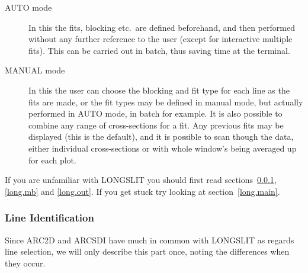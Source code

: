 \begin{description}

\item[AUTO mode] In this the fits, blocking etc.\ are defined
beforehand, and then performed without any further reference to the
user (except for interactive multiple fits).
This can be carried out in batch, thus saving time at the terminal.

\item[MANUAL mode] In this the user can choose the blocking and fit
type for each line as the fits are made, or the fit types may be
defined in manual mode, but actually performed in AUTO mode, in batch
for example.
It is also possible to combine any range of cross-sections for a fit.
Any previous fits may be displayed (this is the default), and it is
possible to scan though the data, either individual cross-sections or
with whole window's being averaged up for each plot.

\end{description}

If you are unfamiliar with LONGSLIT you should first read
sections~\ref{long.id}, \ref{long.mb} and \ref{long.out}.
If you get stuck try looking at section~\ref{long.main}.

\subsubsection{Line Identification}
\label{long.id}

Since ARC2D and ARCSDI have much in common with LONGSLIT as regards
line selection, we will only describe this part once, noting the
differences when they occur.

